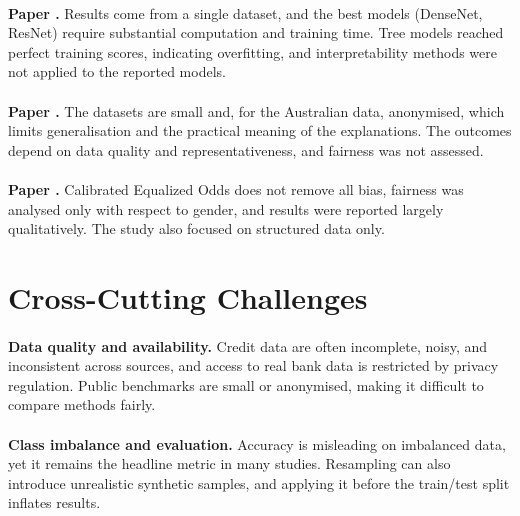 \documentclass[12pt,a4paper,final]{extreport}
\begin{document}
\paragraph{} \textbf{Paper \cite{p2}.} Results come from a single dataset, and the best models (DenseNet, ResNet) require substantial computation and training time. Tree models reached perfect training scores, indicating overfitting, and interpretability methods were not applied to the reported models.

\paragraph{} \textbf{Paper \cite{p3}.} The datasets are small and, for the Australian data, anonymised, which limits generalisation and the practical meaning of the explanations. The outcomes depend on data quality and representativeness, and fairness was not assessed.

\paragraph{} \textbf{Paper \cite{p4}.} Calibrated Equalized Odds does not remove all bias, fairness was analysed only with respect to gender, and results were reported largely qualitatively. The study also focused on structured data only.

\section{Cross-Cutting Challenges}

\paragraph{} \textbf{Data quality and availability.} Credit data are often incomplete, noisy, and inconsistent across sources, and access to real bank data is restricted by privacy regulation. Public benchmarks are small or anonymised, making it difficult to compare methods fairly.

\paragraph{} \textbf{Class imbalance and evaluation.} Accuracy is misleading on imbalanced data, yet it remains the headline metric in many studies. Resampling can also introduce unrealistic synthetic samples, and applying it before the train/test split inflates results.
\end{document}
